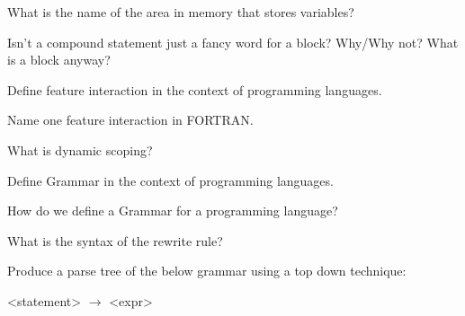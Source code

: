 \documentclass{exam} %
\begin{document}
\begin{questions}
  \question What is the name of the area in memory that stores variables?

  \question Isn't a compound statement just a fancy word for a block? Why/Why not? What is a block anyway?

  \pagebreak

  \question Define feature interaction in the context of programming languages.


  \question Name one feature interaction in FORTRAN.

  \question What is dynamic scoping?

  \question Define Grammar in the context of programming languages.

  \question How do we define a Grammar for a programming language?

  \question What is the syntax of the rewrite rule?

  \question Produce a parse tree of the below grammar using a top down technique:
    \begin{grammar}
      <statement> $\rightarrow$ <expr> 
    \end{grammar}



\end{questions}
\end{document}
